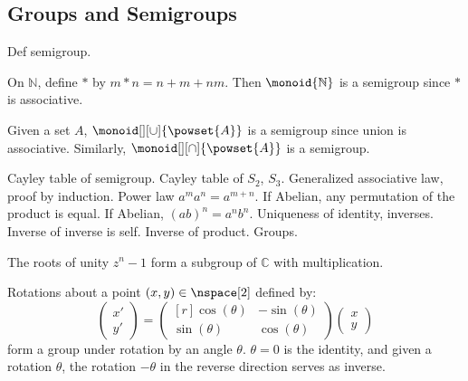 \documentclass{article}                                                        %
\begin{document}
        \subsection{Groups and Semigroups}
            Def semigroup.
            \begin{example}
                On $\mathbb{N}$, define $*$ by $m*n=n+m+nm$. Then
                $\monoid{\mathbb{N}}$ is a semigroup since $*$ is associative.
            \end{example}
            \begin{example}
                Given a set $A$, $\monoid[][\cup]{\powset{A}}$ is a semigroup
                since union is associative. Similarly,
                $\monoid[][\cap]{\powset{A}}$ is a semigroup.
            \end{example}
            Cayley table of semigroup. Cayley table of $S_{2}$, $S_{3}$.
            Generalized associative law, proof by induction. Power law
            $a^{m}a^{n}=a^{m+n}$. If Abelian, any permutation of the product is
            equal. If Abelian, $(ab)^{n}=a^{n}b^{n}$. Uniqueness of identity,
            inverses. Inverse of inverse is self. Inverse of product. Groups.
            \begin{example}
                The roots of unity $z^{n}-1$ form a subgroup of $\mathbb{C}$
                with multiplication.
            \end{example}
            \begin{example}
                Rotations about a point $(x,y)\in\nspace[2]$ defined by:
                \begin{equation}
                    \begin{pmatrix}
                        x'\\
                        y'
                    \end{pmatrix}=
                    \begin{pmatrix*}[r]
                        \cos(\theta)&\minus\sin(\theta)\\
                        \sin(\theta)&\cos(\theta)
                    \end{pmatrix*}
                    \begin{pmatrix}
                        x\\
                        y
                    \end{pmatrix}
                \end{equation}
                form a group under rotation by an angle $\theta$. $\theta=0$ is
                the identity, and given a rotation $\theta$, the rotation
                $\minus\theta$ in the reverse direction serves as inverse.
            \end{example}
\end{document}
